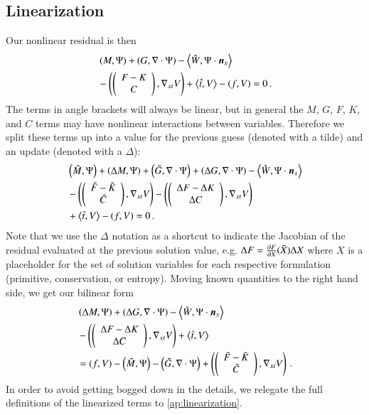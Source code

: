 \documentclass[preprint,12pt]{elsarticle}
\begin{document}
\subsection{Linearization}
Our nonlinear residual is then
\begin{align*}
&\left( M,\Psi \right)+\left( G,\nabla\cdot\Psi \right)-\left\langle \hat W,\Psi\cdot\boldsymbol n_x \right\rangle\\
&-\left( \left( \begin{array}{c} F-K\\ C\\ \end{array} \right),\nabla_{xt} V \right)+\left\langle \hat t,V \right\rangle-\left( f,V \right)=0\,.
\end{align*}
The terms in angle brackets will always be linear, but in general the $M$, $G$, $F$, $K$, and $C$ terms may have nonlinear interactions
between variables.
Therefore we split these terms up into a value for the previous guess (denoted with a tilde) and an update (denoted with a $\Delta$):
\begin{align*}
&\left( \tilde M,\Psi \right) + \left( \Delta M,\Psi \right)
+\left( \tilde G,\nabla\cdot\Psi \right) + \left( \Delta G,\nabla\cdot\Psi \right)
-\left\langle \hat W,\Psi\cdot\boldsymbol n_x \right\rangle\\
&-\left( \left( \begin{array}{c} \tilde F-\tilde K\\ \tilde C\\ \end{array} \right),\nabla_{xt} V \right) - \left( \left( \begin{array}{c} \Delta F-\Delta K\\ \Delta C\\ \end{array} \right),\nabla_{xt} V \right)\\
&+\left\langle \hat t,V \right\rangle-\left( f,V \right)=0\,.
\end{align*}
Note that we use the $\Delta$ notation as a shortcut to indicate the Jacobian of the residual evaluated at the previous solution value, e.g.
$\Delta F=\frac{\partial F}{\partial X}(\tilde X)\Delta X$ where $X$ is a placeholder for the set of solution variables for each respective formulation 
(primitive, conservation, or entropy).
Moving known quantities to the right hand side, we get our bilinear form
\begin{align}
\label{eq:AbstractBilinearForm}
&\left( \Delta M,\Psi \right)
+\left( \Delta G,\nabla\cdot\Psi \right)
-\left\langle \hat W,\Psi\cdot\boldsymbol n_x \right\rangle\\
&-\left( \left( \begin{array}{c} \Delta F-\Delta K\\ \Delta C\\ \end{array} \right),\nabla_{xt} V \right)
+\left\langle \hat t,V \right\rangle\\
&=\left( f,V \right)
-\left( \tilde M,\Psi \right) 
-\left( \tilde G,\nabla\cdot\Psi \right) 
+\left( \left( \begin{array}{c} \tilde F-\tilde K\\ \tilde C\\ \end{array} \right),\nabla_{xt} V \right)\,.
\end{align}
In order to avoid getting bogged down in the details, we relegate the full definitions of the linearized terms to \ref{ap:linearization}.


%                                                                                            
%                                                                                            
%      
\end{document}
